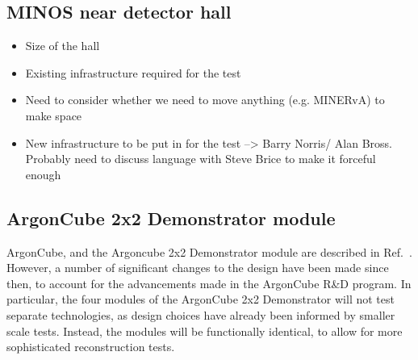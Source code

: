 \FloatBarrier
\subsection{MINOS near detector hall}
\label{sec:minos-hall}
\begin{itemize}
\item Size of the hall
\item Existing infrastructure required for the test
\item Need to consider whether we need to move anything (e.g. MINERvA) to make space
\item New infrastructure to be put in for the test --> Barry Norris/ Alan Bross. Probably need to discuss language with Steve Brice to make it forceful enough
\end{itemize}

\subsection{ArgonCube 2x2 Demonstrator module}
\label{sec:2x2-design}

ArgonCube, and the Argoncube 2x2 Demonstrator module are described in Ref.~\cite{argoncube_loi}. However, a number of significant changes to the design have been made since then, to account for the advancements made in the ArgonCube R\&D program. In particular, the four modules of the ArgonCube 2x2 Demonstrator will not test separate technologies, as design choices have already been informed by smaller scale tests. Instead, the modules will be functionally identical, to allow for more sophisticated reconstruction tests.

